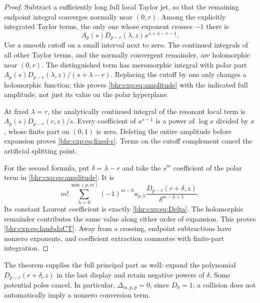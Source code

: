 \begin{proof}
Subtract a sufficiently long full local Taylor jet, so that the
remaining endpoint integral converges normally near \((0,r)\).
Among the explicitly integrated Taylor terms, the only one whose
exponent crosses \(-1\) there is
\[
 A_p(s)D_{p-r}(\lambda,z)
                 x^{s+\lambda-r-1}.
\]
Use a smooth cutoff on a small interval next to zero.
The continued integrals of all other Taylor terms, and the normally
convergent remainder, are holomorphic near \((0,r)\).
The distinguished term has meromorphic integral with polar part
\(A_p(s)D_{p-r}(\lambda,z)/(s+\lambda-r)\).
Replacing the cutoff by one only changes a holomorphic function;
this proves \eqref{bhr:cxp:eq:amplitude} with the indicated full
amplitude, not just its value on the polar hyperplane.

At fixed \(\lambda=r\), the analytically continued integral of
the resonant local term is \(A_p(s)D_{p-r}(r,z)/s\).
Every coefficient of \(x^{s-1}\) is a power of \(\log x\)
divided by \(x\), whose finite part on \((0,1)\) is zero.
Deleting the entire amplitude before expansion proves
\eqref{bhr:cxp:eq:fixed-r}.  Terms on the cutoff complement
cancel the artificial splitting point.

For the second formula, put \(\delta=\lambda-r\) and take
the \(s^m\) coefficient of the polar term in
\eqref{bhr:cxp:eq:amplitude}.  It is
\[
 m!\sum_{h=0}^{\min(p,m)}
  (-1)^{m-h}a_{p,h}
       \frac{D_{p-r}(r+\delta,z)}{\delta^{m-h+1}}.
\]
Its constant Laurent coefficient is exactly
\eqref{bhr:cxp:eq:Delta}.  The holomorphic remainder contributes
the same value along either order of expansion.  This proves
\eqref{bhr:cxp:eq:lambdaCT}.  Away from a crossing, endpoint
subtractions have nonzero exponents, and coefficient extraction
commutes with finite-part integration.
\end{proof}

The theorem supplies the full principal part as well: expand the
polynomial \(D_{p-r}(r+\delta,z)\) in the last display and retain
negative powers of \(\delta\).  Some potential poles cancel.
In particular, \(\Delta_{m,p,p}=0\), since \(D_0=1\);
a collision does not automatically imply a nonzero conversion term.

